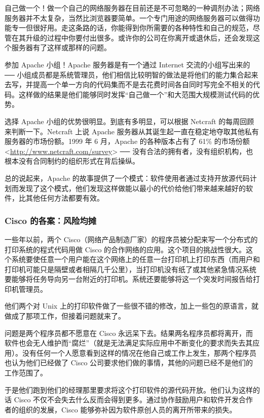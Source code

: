 自己做一个！做一个自己的网络服务器在目前还是不可忽略的一种调剂办法；网络服务器并不太复杂，当然比浏览器要简单。一个专门用途的网络服务器可以做得功能专一但很好用。走这条路的话，你能得到你所需要的各种特性和自己的规范，尽管在其升级的过程中你要付出很多。或许你的公司在你离开或退休后，还会发现这个服务器有了这样或那样的问题。


参加 Apache 小组！Apache 服务器是有一个通过 Internet 交流的小组写出来的  ──  小组成员都是系统管理员，他们相信比较明智的做法是将他们的能力集合起来去写，并提高一个单一方向的代码集而不是去花费时间各自同时写完全不相关的代码。这样做的结果是他们能够同时发挥“自己做一个”和大范围大规模测试代码的优势。


选择 Apache 小组的优势很明显。到底有多明显，可以根据 Netcraft 的每周回顾来判断一下。Netcraft 上说 Apache 服务器从其诞生起一直在稳定地夺取其他私有服务器的市场份额。1999 年 6 月，Apache 的各种版本占有了 61\% 的市场份额 <\url{http://www.netcraft.com/survey}> ── 没有合法的拥有者，没有组织机构，也根本没有合同制约的组织形式在背后操纵。


总的说起来，Apache 的故事提供了一个模式：软件使用者通过支持开放源代码计划而发现了这个模式，他们发现这样做能以最小的代价给他们带来越来越好的软件，比其他任何方法都要有效。

\subsubsection{Cisco 的各案：风险均摊}
一些年以前，两个 Cisco（网络产品制造厂家）的程序员被分配来写一个分布式的打印系统的程式代码用做 Cisco 的合作网络的应用。这个项目的挑战性很大。这个系统要使任意一个用户能在这个网络上的任意一台打印机上打印东西（而用户和打印机可能只是隔壁或者相隔几千公里），当打印机没有纸了或其他紧急情况系统要能够将任务导向另一台附近的打印机。系统还要能够将这一个突发时间报告给打印机管理员。


他们两个对 Unix 上的打印软件做了一些很不错的修改，加上一些包的原语言，就做成了那项工作，但接着问题就来了。


问题是两个程序员都不愿意在 Cisco 永远呆下去。结果两名程序员都将离开，而软件也会无人维护而“腐烂”（就是无法满足实际应用中不断变化的要求而失去其应用）。没有任何一个人愿意看到这样的情况在他自己或工作上发生，那两个程序员也认为他们已经做了 Cisco 公司要求他们做的事情，其他的问题已经不是他们的工作范围了。


于是他们跑到他们的经理那里要求将这个打印软件的源代码开放。他们认为这样的话 Cisco 不仅不会失去什么反而会得到更多。通过协作鼓励用户和软件开发合作者的组织的发展，Cisco 能够弥补因为软件原创人员的离开所带来的损失。


